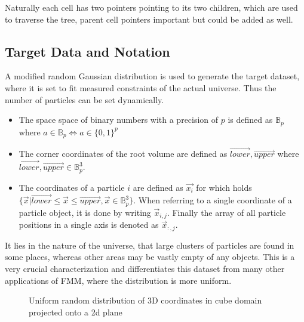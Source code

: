 \documentclass[]{article}
\begin{document}
Naturally each cell has two pointers pointing to its two children, which are used to traverse the tree, parent cell pointers important but could be added as well.


\subsection{Target Data and Notation}\label{sec:target-data}

A modified random Gaussian distribution is used to generate the target dataset, where it is set to fit measured constraints of the actual universe. Thus the number of particles can be set dynamically. 

\begin{itemize}
	\item The space space of binary numbers with a precision of $p$ is defined as $\mathbb{B}_p$ where $a \in \mathbb{B}_p \Leftrightarrow a \in \{0,1\}^{p}$
	\item The corner coordinates of the root volume are defined as $\vec{lower}, \vec{upper}$ where $\vec{lower}, \vec{upper} \in \mathbb{B}_p^3$. 
	\item The coordinates of a particle $i$ are defined as $\vec{x_i}$ for which holds $\{\vec{x} | \vec{lower} \leq \vec{x} \leq \vec{upper}, \vec{x} \in \mathbb{B}_p^3 \}$.
	When referring to a single coordinate of a particle object, it is done by writing $\vec{x}_{i,j}$. Finally the array of all particle positions in a single axis is denoted as $\vec{x}_{:,j}$. 
	
\end{itemize}

It lies in the nature of the universe, that large clusters of particles are found in some places, whereas other areas may be vastly empty of any objects. This is a very crucial characterization and differentiates this dataset from many other applications of FMM, where the distribution is more uniform.

\begin{figure}[H]
	\begin{center}
	\end{center}
	\caption{Uniform random distribution of 3D coordinates in cube domain projected onto a 2d plane}
\end{figure}
\end{document}
